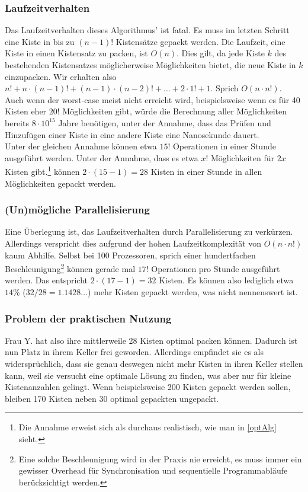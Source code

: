 \subsubsection{Laufzeitverhalten}
 Das Laufzeitverhalten dieses Algorithmus' ist fatal. Es muss im letzten Schritt eine Kiste in bis zu $(n-1)!$ Kistensätze gepackt werden.
 Die Laufzeit, eine Kiste in einen Kistensatz zu packen, ist $O(n)$.
 Dies gilt, da jede Kiste $k$ des bestehenden Kistensatzes möglicherweise Möglichkeiten bietet, die neue Kiste in $k$ einzupacken.
 Wir erhalten also $n! + n \cdot (n-1)! +  (n-1) \cdot (n-2)! + \dots + 2 \cdot 1! + 1$. Sprich $O(n \cdot n!)$. \\
 Auch wenn der worst-case meist nicht erreicht wird, beispielsweise wenn es für 40 Kisten eher $20!$ Möglichkeiten gibt,
 würde die Berechnung aller Möglichkeiten bereits $8 \cdot 10^{15}$ Jahre benötigen,
  unter der Annahme, dass das Prüfen und Hinzufügen einer Kiste in eine andere Kiste eine Nanosekunde dauert. \\
 Unter der gleichen Annahme können etwa $15!$ Operationen in einer Stunde ausgeführt werden.
 Unter der Annahme, dass es etwa $x!$ Möglichkeiten für $2x$ Kisten gibt.\footnote{
   Die Annahme erweist sich als durchaus realistisch, wie man in \ref{optAlg} sieht.}
 können $2 \cdot (15-1)=28$ Kisten in einer Stunde in allen Möglichkeiten gepackt werden.
\subsubsection{(Un)mögliche Parallelisierung}
 Eine Überlegung ist, das Laufzeitverhalten durch Parallelisierung zu verkürzen.
 Allerdings verspricht dies aufgrund der hohen Laufzeitkomplexität von $O(n \cdot n!)$ kaum Abhilfe.
 Selbst bei 100 Prozessoren, sprich einer hundertfachen Beschleunigung\footnote{Eine solche Beschleunigung wird in der Praxis nie erreicht,
 es muss immer ein gewisser Overhead für Synchronisation und sequentielle Programmabläufe berücksichtigt werden.}
 können gerade mal $17!$ Operationen pro Stunde ausgeführt werden. Das entspricht $2 \cdot (17-1)=32$ Kisten.
 Es können also lediglich etwa $14\%$ ($32/28=1.1428\dots$) mehr Kisten gepackt werden, was nicht nennenswert ist.
\subsubsection{Problem der praktischen Nutzung}
 Frau Y. hat also ihre mittlerweile 28 Kisten optimal packen können. Dadurch ist nun Platz in ihrem Keller frei geworden.
 Allerdings empfindet sie es als widersprüchlich, dass sie genau deswegen nicht mehr Kisten in ihren Keller stellen kann, weil sie versucht eine optimale Lösung zu finden,
  was aber nur für kleine Kistenanzahlen gelingt.
 Wenn beispielsweise 200 Kisten gepackt werden sollen, bleiben 170 Kisten neben 30 optimal gepackten ungepackt. \\
